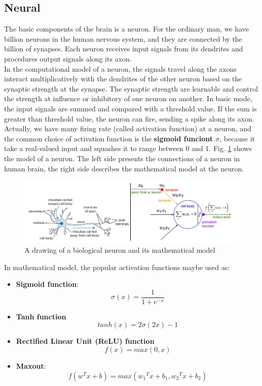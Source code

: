 \subsection{Neural}
The basic components of the brain is a neuron. For the ordinary man, we have billion neurons in the human nervous system, and they are connected by the billion of synapses. Each neuron receives input signals from its dendrites and procedures output signals along its axon.\\[0.2cm]
In the computational model of a neuron, the signals travel along the axons interact multiplicatively with the dendrites of the other neuron based on the synaptic strength at the synapse. The synaptic strength are learnable and control the strength at influence or inhibitory of one neuron on another. In basic mode, the input signals are summed and compared with a threshold value. If the sum is greater than threshold value, the neuron can fire, sending a spike along its axon. Actually, we have many firing rate (called activation function) at a neuron, and the common choice of activation function is the \textbf{sigmoid funciont $\sigma$}, because it take a real-valued input and squashes it to range between 0 and 1. Fig. \ref{fignneuron} shows the model of a neuron. The left side presents the connections of a neuron in human brain, the right side describes the mathematical model at the neuron.
\begin{figure}[h]
	\centering
	\includegraphics[scale=0.5]{images/neurons.png}
	\caption{A drawing of a biological neuron and its mathematical model}
	\label{fignneuron}
\end{figure}

In mathematical model, the popular activation functions maybe used as:
\begin{itemize}
	\item \textbf{Sigmoid function}:
		\begin{equation}
			\sigma(x) = \frac{1}{1+e^{-x}}
		\end{equation}
	\item \textbf{Tanh function}
		\begin{equation}
			tanh(x) = 2\sigma(2x) - 1
		\end{equation}
	\item \textbf{Rectified Linear Unit (ReLU) function}
		\begin{equation}
			f(x) = max(0,x)
		\end{equation}
	\item \textbf{Maxout}:
		\begin{equation}
			f(w^Tx + b) = max({w_1}^Tx + b_1,{w_2}^Tx + b_2)
		\end{equation}
\end{itemize}
